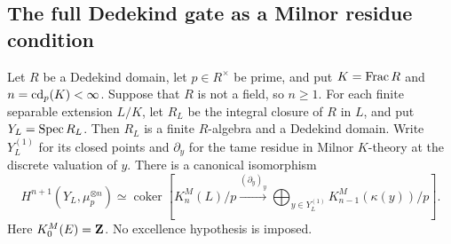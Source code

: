 \subsection{The full Dedekind gate as a Milnor residue condition}

\begin{lemma}
\label{A:Dedekind-Milnor-obstruction}
Let $R$ be a Dedekind domain, let $p\in R^\times$ be prime, and
put $K=\operatorname{Frac} R$ and $n=\operatorname{cd}_p(K)<\infty$. Suppose that $R$ is not a
field, so $n\geq1$. For each finite separable extension $L/K$, let
$R_L$ be the integral closure of $R$ in $L$, and put $Y_L=\operatorname{Spec} R_L$.
Then $R_L$ is a finite $R$-algebra and a Dedekind domain. Write
$Y_L^{(1)}$ for its closed points and $\partial_y$ for the tame
residue in Milnor $K$-theory at the discrete valuation of $y$.
There is a canonical isomorphism
\[
 H^{n+1}(Y_L,\mu_p^{\otimes n})\simeq
 \operatorname{coker}\left[
 K_n^M(L)/p\xrightarrow{(\partial_y)_y}
 \bigoplus_{y\in Y_L^{(1)}}K_{n-1}^M(\kappa(y))/p
 \right].
\]
Here $K_0^M(E)=\mathbf Z$. No excellence hypothesis is imposed.
\end{lemma}

